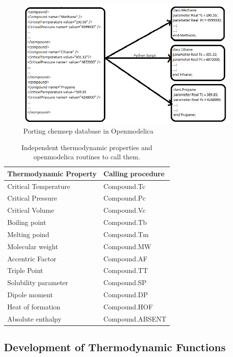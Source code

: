 \documentclass[12pt]{report}
\begin{document}
\begin{figure}
\centering
\includegraphics[width=0.8\linewidth]{BT1}
\caption{Porting chemsep database in Openmodelica}
\label{fig:BT1}
\end{figure}


\begin{table}
\centering
\caption {Independent thermodynamic properties and openmodelica routines to call them.}
\label{tab:indprop}
\vspace{1ex}
\begin{tabular}{l|l} \hline
Thermodynamic Property & Calling procedure \\ \hline
Critical Temperature & Compound.Tc \\
Critical Pressure & Compound.Pc \\
Critical Volume & Compound.Vc \\
Boiling point & Compound.Tb \\
Melting poind & Compound.Tm \\
Molecular weight & Compound.MW \\
Accentric Factor & Compound.AF \\
Triple Point & Compound.TT \\
Solubility parameter & Compound.SP \\ 
Dipole moment & Compound.DP \\ 
Heat of formation & Compound.HOF \\ 
Absolute enthalpy & Compound.ABSENT \\ \hline
\end{tabular}
\end{table}

\subsection{Development of Thermodynamic Functions}
\end{document}
